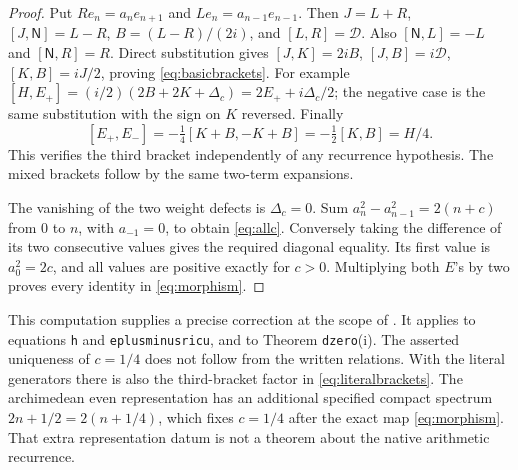 \documentclass[11pt]{article}
\begin{document}
\begin{proof}
Put $Re_n=a_ne_{n+1}$ and $Le_n=a_{n-1}e_{n-1}$.
Then $J=L+R$, $[J,\mathsf N]=L-R$,
$B=(L-R)/(2i)$, and $[L,R]=\mathcal D$.
Also $[\mathsf N,L]=-L$ and $[\mathsf N,R]=R$.
Direct substitution gives $[J,K]=2iB$,
$[J,B]=i\mathcal D$, $[K,B]=iJ/2$, proving
\eqref{eq:basicbrackets}. For example
$[H,E_+]=(i/2)(2B+2K+\Delta_c)
 =2E_++i\Delta_c/2$; the negative case is the same
substitution with the sign on $K$ reversed.
Finally
\[
 [E_+,E_-]=-\tfrac14[K+B,-K+B]
          =-\tfrac12[K,B]=H/4.
\]
This verifies the third bracket independently of any
recurrence hypothesis. The mixed brackets follow by the
same two-term expansions.

The vanishing of the two weight defects is $\Delta_c=0$.
Sum $a_n^2-a_{n-1}^2=2(n+c)$ from $0$ to $n$, with
$a_{-1}=0$, to obtain \eqref{eq:allc}. Conversely taking
the difference of its two consecutive values gives
the required diagonal equality. Its first value is
$a_0^2=2c$, and all values are positive exactly for $c>0$.
Multiplying both $E$'s by two proves every identity
in \eqref{eq:morphism}.
\end{proof}

This computation supplies a precise correction at the scope
of \cite{CCM}. It applies to equations \texttt{h} and
\texttt{eplusminusricu}, and to Theorem \texttt{dzero}(i).
The asserted uniqueness of $c=1/4$ does not follow from the
written relations. With the literal generators there is
also the third-bracket factor in \eqref{eq:literalbrackets}.
The archimedean even representation has an additional
specified compact spectrum $2n+1/2=2(n+1/4)$, which fixes
$c=1/4$ after the exact map \eqref{eq:morphism}.
That extra representation datum is not a theorem about
the native arithmetic recurrence.
\end{document}

